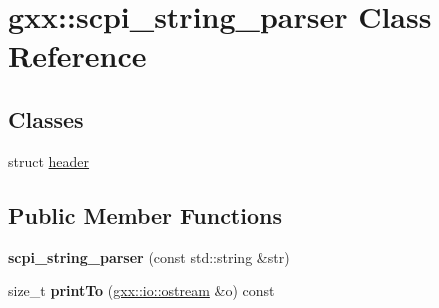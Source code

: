\hypertarget{classgxx_1_1scpi__string__parser}{}\section{gxx\+:\+:scpi\+\_\+string\+\_\+parser Class Reference}
\label{classgxx_1_1scpi__string__parser}
\subsection*{Classes}
\begin{DoxyCompactItemize}
\item 
struct \hyperlink{structgxx_1_1scpi__string__parser_1_1header}{header}
\end{DoxyCompactItemize}
\subsection*{Public Member Functions}
\begin{DoxyCompactItemize}
\item 
{\bfseries scpi\+\_\+string\+\_\+parser} (const std\+::string \&str)\hypertarget{classgxx_1_1scpi__string__parser_abca4e78aff70b200729fab6e9a792898}{}\label{classgxx_1_1scpi__string__parser_abca4e78aff70b200729fab6e9a792898}

\item 
size\+\_\+t {\bfseries print\+To} (\hyperlink{classgxx_1_1io_1_1ostream}{gxx\+::io\+::ostream} \&o) const \hypertarget{classgxx_1_1scpi__string__parser_a306a1b4a9d2b07dca8a688711b20adff}{}\label{classgxx_1_1scpi__string__parser_a306a1b4a9d2b07dca8a688711b20adff}

\end{DoxyCompactItemize}
